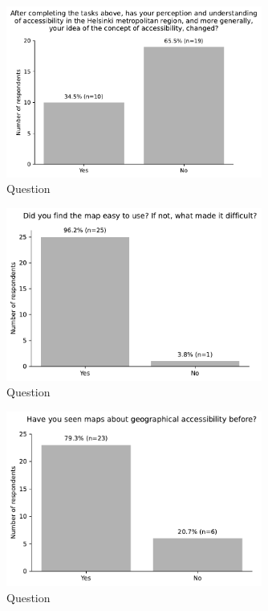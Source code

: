 \begin{figure}[H]
	\centering
	\includegraphics[width=0.75\textwidth]{images/questionnaire/8.pdf}
	\caption{Question}
	\label{fig:architechture}
\end{figure}

\begin{figure}[H]
	\centering
	\includegraphics[width=0.75\textwidth]{images/questionnaire/9.pdf}
	\caption{Question}
	\label{fig:architechture}
\end{figure}

\begin{figure}[H]
	\centering
	\includegraphics[width=0.75\textwidth]{images/questionnaire/10.pdf}
	\caption{Question}
	\label{fig:architechture}
\end{figure}

